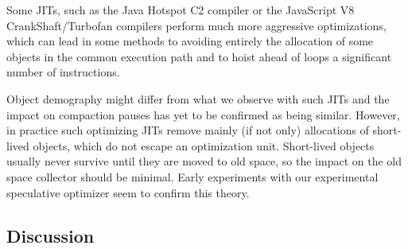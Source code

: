 \documentclass[sigplan,10pt,review,anonymous]{acmart}\settopmatter{printfolios=true,printccs=false,printacmref=false}
\newcommand{\eem}[1]{\color{olive}\fbox{\bfseries\sffamily\scriptsize Eliot:}{\sf\small$\blacktriangleright$\textit{#1}$\blacktriangleleft$}\color{black}}
\begin{document}
Some JITs, such as the Java Hotspot C2 compiler or the JavaScript V8 CrankShaft/Turbofan compilers perform much more aggressive optimizations, which can lead in some methods to avoiding entirely the allocation of some objects in the common execution path and to hoist ahead of loops a significant number of instructions.

Object demography might differ from what we observe with such JITs and the impact on compaction pauses has yet to be confirmed as being similar. However, in practice such optimizing JITs remove mainly (if not only) allocations of short-lived objects, which do not escape an optimization unit. Short-lived objects usually never survive until they are moved to old space, so the impact on the old space collector should be minimal. Early experiments with our experimental speculative optimizer seem to confirm this theory.

%

\subsection{Discussion}
\label{sec:discussion}
\end{document}
